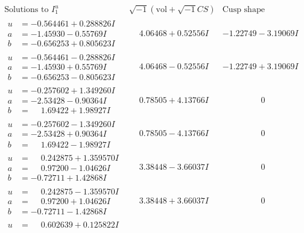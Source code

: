 \documentclass[1p]{elsarticle_modified}
\theoremstyle{definition}
\newcommand{\I}{\sqrt{-1}}
\begin{document}
$$\begin{array}{c|c|c}
\text{Solutions to }I^u_{1}& \I (\text{vol} + \sqrt{-1}CS) & \text{Cusp shape}\\
 \hline 
\begin{aligned}
u &= -0.564461 + 0.288826 I \\
a &= -1.45930 - 0.55769 I \\
b &= -0.656253 + 0.805623 I\end{aligned}
 & \phantom{-}4.06468 + 0.52556 I & -1.22749 - 3.19069 I \\ \hline\begin{aligned}
u &= -0.564461 - 0.288826 I \\
a &= -1.45930 + 0.55769 I \\
b &= -0.656253 - 0.805623 I\end{aligned}
 & \phantom{-}4.06468 - 0.52556 I & -1.22749 + 3.19069 I \\ \hline\begin{aligned}
u &= -0.257602 + 1.349260 I \\
a &= -2.53428 - 0.90364 I \\
b &= \phantom{-}1.69422 + 1.98927 I\end{aligned}
 & \phantom{-}0.78505 + 4.13766 I & \phantom{-0.000000 } 0 \\ \hline\begin{aligned}
u &= -0.257602 - 1.349260 I \\
a &= -2.53428 + 0.90364 I \\
b &= \phantom{-}1.69422 - 1.98927 I\end{aligned}
 & \phantom{-}0.78505 - 4.13766 I & \phantom{-0.000000 } 0 \\ \hline\begin{aligned}
u &= \phantom{-}0.242875 + 1.359570 I \\
a &= \phantom{-}0.97200 - 1.04626 I \\
b &= -0.72711 + 1.42868 I\end{aligned}
 & \phantom{-}3.38448 - 3.66037 I & \phantom{-0.000000 } 0 \\ \hline\begin{aligned}
u &= \phantom{-}0.242875 - 1.359570 I \\
a &= \phantom{-}0.97200 + 1.04626 I \\
b &= -0.72711 - 1.42868 I\end{aligned}
 & \phantom{-}3.38448 + 3.66037 I & \phantom{-0.000000 } 0 \\ \hline\begin{aligned}
u &= \phantom{-}0.602639 + 0.125822 I \\

\end{aligned}
\end{array}$$
\end{document}
